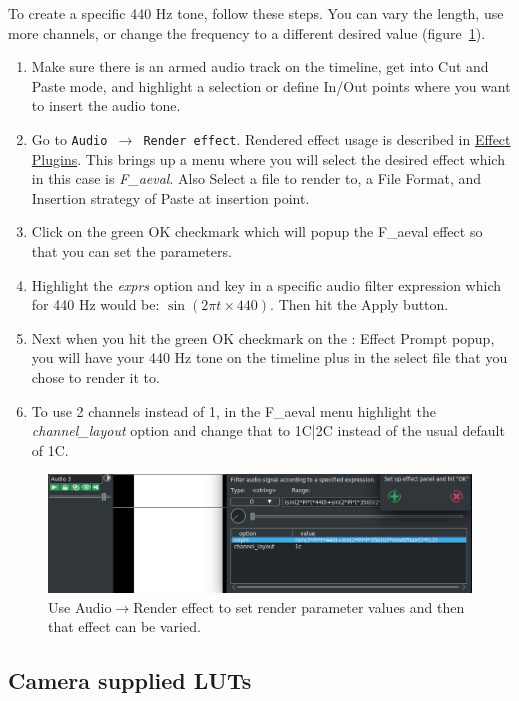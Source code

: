 To create a specific 440 Hz tone, follow these steps.  You can vary the length, use more channels, or change the frequency to a different desired value (figure~\ref{fig:aeval}).

\begin{enumerate}
	\item Make sure there is an armed audio track on the timeline, get into Cut and Paste mode, and highlight
	a selection or define In/Out points where you want to insert the audio tone.
	\item Go to \texttt{Audio $\rightarrow$ Render effect}.  Rendered effect usage is described in \hyperref[sec:rendered_effects]{Effect Plugins}. This brings up a menu where you will select the desired effect which in this case is \textit{F\_aeval}.  Also Select a file to render to, a File Format, and Insertion strategy of Paste at insertion point.
	\item Click on the green OK checkmark which will popup the F\_aeval effect so that you can set the
	parameters.
	\item Highlight the \textit{exprs} option and key in a specific audio filter expression which for 440 Hz would be:
	$\sin(2\pi t\times440)$.  Then hit the Apply button.
	\item Next when you hit the green OK checkmark on the \CGG{}: Effect Prompt popup, you will have
	your 440 Hz tone on the timeline plus in the select file that you chose to render it to.
	\item To use 2 channels instead of 1, in the F\_aeval menu highlight the \textit{channel\_layout} option and change
	that to 1C|2C instead of the usual default of 1C.
\end{enumerate}

\begin{figure}[htpb]
	\centering
	\includegraphics[width=1.0\linewidth]{images/aeval.png}
	\caption{Use Audio$\rightarrow$Render effect to set render parameter values and then that effect can be varied.}
	\label{fig:aeval}
\end{figure}

\subsection{Camera supplied LUTs}%
\label{sub:camera_supplied_luts}

